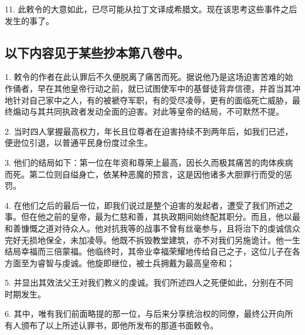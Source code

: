 11. 此敕令的大意如此，已尽可能从拉丁文译成希腊文。现在该思考这些事件之后发生的事了。\par


\subsection{以下内容见于某些抄本第八卷中。}

1. 敕令的作者在此认罪后不久便脱离了痛苦而死。据说他乃是这场迫害苦难的始作俑者，早在其他皇帝行动之前，就已试图使军中的基督徒背弃信德，并首当其冲地针对自己家中之人，有的被褫夺军职，有的受尽凌辱，更有的面临死亡威胁，最终煽动与其共同执政者发动全面的迫害。对此等皇帝的结局，不可默然不提。\par

2. 当时四人掌握最高权力，年长且位尊者在迫害持续不到两年后，如我们已述，便逊位引退，以普通平民身份度过余生。\par

3. 他们的结局如下：第一位在年资和尊荣上最高，因长久而极其痛苦的肉体疾病而死。第二位则自缢身亡，依某种恶魔的预言，这是因他诸多大胆罪行而受的惩罚。\par

4. 在他们之后的最后一位，即我们说过是整个迫害的发起者，遭受了我们所述之事。但在他之前的皇帝，最为仁慈和善，其执政期间始终配其职分。而且，他以最和善慷慨之道对待众人。他对抗我等的战事不曾有丝毫参与，且将治下的虔诚信众完好无损地保全，未加凌辱。他既不拆毁教堂建筑，亦不对我们另施诡计。他一生结局幸福而三倍蒙福。他临终时，其帝业幸福荣耀地传给自己之子，这位儿子在各方面至为睿智与虔诚。他旋即继位，被士兵拥戴为最高皇帝和；\par

5. 并显出其效法父王对我们教义的虔诚。我们所述四人之死便如此，分别在不同时期发生。\par

6. 其中，唯有我们前面略提的那一位，与后来分享统治权的同僚，最终公开向所有人颁布了以上所述认罪书，即他所发布的那道书面敕令。\par



